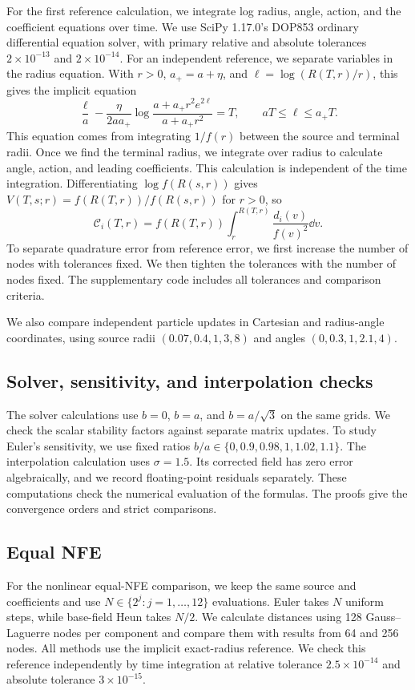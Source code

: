 For the first reference calculation, we integrate log radius, angle, action, and the coefficient equations over time. We use SciPy 1.17.0's DOP853 ordinary differential equation solver, with primary relative and absolute tolerances $2\times10^{-13}$ and $2\times10^{-14}$. For an independent reference, we separate variables in the radius equation. With $r>0$, $a_+=a+\eta$, and $\ell=\log(R(T,r)/r)$, this gives the implicit equation
\[
 \frac\ell a-\frac\eta{2a a_+}
 \log\frac{a+a_+r^2e^{2\ell}}{a+a_+r^2}=T,
 \qquad aT\le\ell\le a_+T.
\]
This equation comes from integrating $1/f(r)$ between the source and terminal radii. Once we find the terminal radius, we integrate over radius to calculate angle, action, and leading coefficients. This calculation is independent of the time integration. Differentiating $\log f(R(s,r))$ gives $V(T,s;r)=f(R(T,r))/f(R(s,r))$ for $r>0$, so
\[
 \mathcal C_i(T,r)=f(R(T,r))\int_r^{R(T,r)}\frac{d_i(v)}{f(v)^2}\dd v.
\]
To separate quadrature error from reference error, we first increase the number of nodes with tolerances fixed. We then tighten the tolerances with the number of nodes fixed. The supplementary code includes all tolerances and comparison criteria.

We also compare independent particle updates in Cartesian and radius-angle coordinates, using source radii $(0.07,0.4,1,3,8)$ and angles $(0,0.3,1,2.1,4)$.

\subsection{Solver, sensitivity, and interpolation checks}

The solver calculations use $b=0$, $b=a$, and $b=a/\sqrt3$ on the same grids. We check the scalar stability factors against separate matrix updates. To study Euler's sensitivity, we use fixed ratios $b/a\in\{0,0.9,0.98,1,1.02,1.1\}$. The interpolation calculation uses $\sigma=1.5$. Its corrected field has zero error algebraically, and we record floating-point residuals separately. These computations check the numerical evaluation of the formulas. The proofs give the convergence orders and strict comparisons.


\subsection{Equal NFE}

For the nonlinear equal-NFE comparison, we keep the same source and coefficients and use $N\in\{2^j:j=1,\ldots,12\}$ evaluations. Euler takes $N$ uniform steps, while base-field Heun takes $N/2$. We calculate distances using 128 Gauss--Laguerre nodes per component and compare them with results from 64 and 256 nodes. All methods use the implicit exact-radius reference. We check this reference independently by time integration at relative tolerance $2.5\times10^{-14}$ and absolute tolerance $3\times10^{-15}$.

